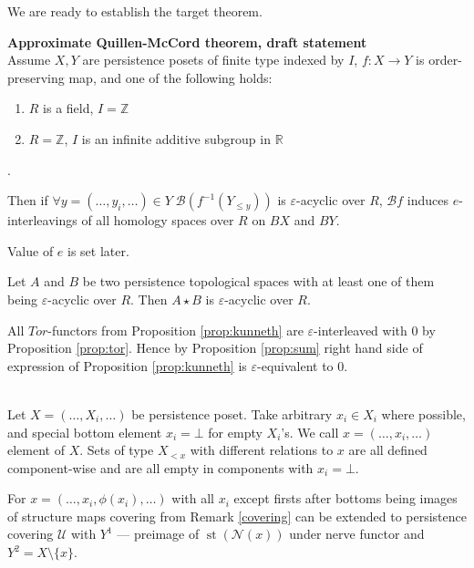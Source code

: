 We are ready to establish the target theorem.\\

\begin{theorem} \textbf{Approximate Quillen-McCord theorem, draft statement}\\
  Assume $X, Y$ are persistence posets of finite type indexed by $I$, $f : X \to Y$ is order-preserving map, and one of the following holds:\\
  \begin{enumerate}
    \item $R$ is a field, $I = \mathbb{Z}$
    \item $R = \mathbb{Z}$, $I$ is an infinite additive subgroup in $\mathbb{R}$
  \end{enumerate}.

  Then if $\forall y=(\ldots,y_i,\ldots) \in Y\;\mathcal{B}(f^{-1}(Y_{\leqslant y}))$ is $\varepsilon$-acyclic over $R$, $\mathcal{B}f$ induces $e$-interleavings of all homology spaces over $R$ on $BX$ and $BY$.\\
\end{theorem}

Value of $e$ is set later.\\

\begin{proposition}
  \label{prop:acyclic}
  Let $A$ and $B$ be two persistence topological spaces with at least one of them being $\varepsilon$-acyclic over $R$. Then $A \star B$ is $\varepsilon$-acyclic over $R$.
\end{proposition}

\begin{pf}
  All $Tor$-functors from Proposition \ref{prop:kunneth} are $\varepsilon$-interleaved with $0$ by Proposition \ref{prop:tor}. Hence by Proposition \ref{prop:sum} right hand side of expression of Proposition \ref{prop:kunneth} is $\varepsilon$-equivalent to $0$.\\
\end{pf}\\

Let $X=(\ldots,X_i,\ldots)$ be persistence poset. Take arbitrary $x_i \in X_i$ where possible, and special bottom element $x_i = \bot$ for empty $X_i$'s. We call $x = (\ldots, x_i, \ldots)$ element of $X$. Sets of type $X_{<x}$ with different relations to $x$ are all defined component-wise and are all empty in components with $x_i = \bot$.\\

\begin{proposition}
  For $x = (\ldots,x_i,\phi(x_i),\ldots)$ with all $x_i$ except firsts after bottoms being images of structure maps covering from Remark \ref{covering} can be extended to persistence covering $\mathcal{U}$ with $Y^1$ --- preimage of $\operatorname{st}(\mathcal{N}(x))$ under nerve functor and $Y^2 = X \setminus \{x\}$.
\end{proposition}

